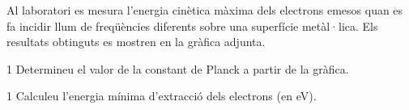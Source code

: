 Al laboratori es mesura l'energia cinètica màxima dels electrons emesos quan es fa incidir llum de freqüències diferents sobre una superfície metàl·lica. Els resultats obtinguts es mostren en la gràfica adjunta.


\begin{apartat}{1}
Determineu el valor de la constant de Planck a partir de la gràfica.
\end{apartat}

\begin{apartat}{1}
Calculeu l'energia mínima d'extracció dels electrons (en eV).
\end{apartat}

